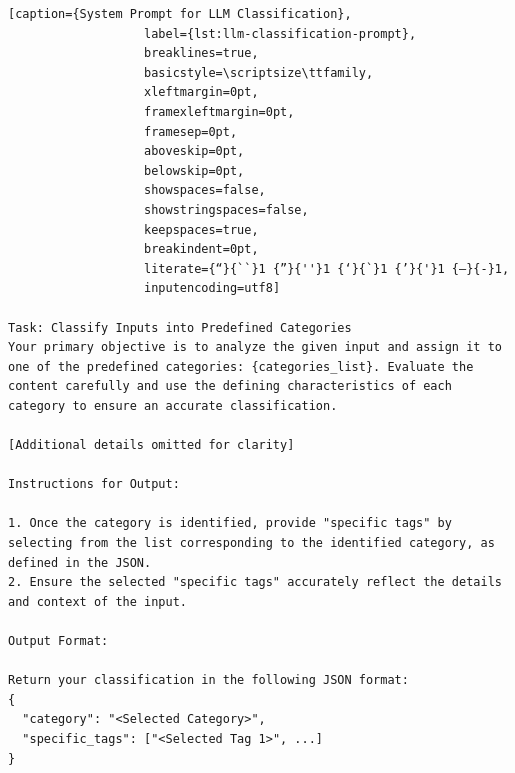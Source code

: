 \documentclass[conference]{IEEEtran}
\begin{document}
\vspace{2.0\baselineskip}
\begin{lstlisting}[caption={System Prompt for LLM Classification}, 
                   label={lst:llm-classification-prompt}, 
                   breaklines=true, 
                   basicstyle=\scriptsize\ttfamily, 
                   xleftmargin=0pt, 
                   framexleftmargin=0pt, 
                   framesep=0pt, 
                   aboveskip=0pt, 
                   belowskip=0pt, 
                   showspaces=false, 
                   showstringspaces=false,
                   keepspaces=true,
                   breakindent=0pt,
                   literate={“}{``}1 {”}{''}1 {‘}{`}1 {’}{'}1 {–}{-}1,
                   inputencoding=utf8]

Task: Classify Inputs into Predefined Categories
Your primary objective is to analyze the given input and assign it to one of the predefined categories: {categories_list}. Evaluate the content carefully and use the defining characteristics of each category to ensure an accurate classification.

[Additional details omitted for clarity]

Instructions for Output:

1. Once the category is identified, provide "specific tags" by selecting from the list corresponding to the identified category, as defined in the JSON.
2. Ensure the selected "specific tags" accurately reflect the details and context of the input.

Output Format:

Return your classification in the following JSON format:
{
  "category": "<Selected Category>",
  "specific_tags": ["<Selected Tag 1>", ...]
}
\end{lstlisting}




\end{document}
